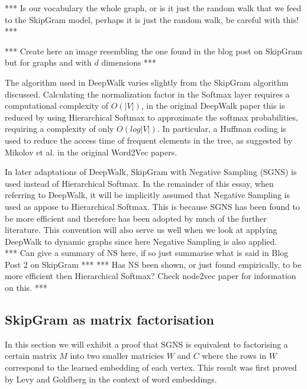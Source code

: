 \documentclass[a4paper]{article}
\begin{document}
*** Is our vocabulary the whole graph, or is it just the random walk that we
feed to the SkipGram model, perhaps it is just the random walk, be careful with
this! ***

*** Create here an image resembling the one found in the blog post on SkipGram
but for graphs and with $d$ dimensions ***

The algorithm used in DeepWalk varies slightly from the SkipGram algorithm
discussed. Calculating the normalization factor in the Softmax layer requires a
computational complexity of $O(|V|)$, in the original DeepWalk paper this is
reduced by using Hierarchical Softmax to approximate the softmax probabilities,
requiring a complexity of only $O(log|V|)$. In particular, a Huffman coding is
used to reduce the access time of frequent elements in the tree, as suggested by
Mikolov et al. in the original Word2Vec
papers.\cite{mikolov2013distributed,mikolov2013efficient}

In later adaptations of DeepWalk, SkipGram with Negative Sampling (SGNS) is used instead of
Hierarchical Softmax. In the remainder of this essay, when referring to DeepWalk, it will be
implicitly assumed that Negative Sampling is used as appose to Hierarchical
Softmax. This is because SGNS has been found to be more efficient
and therefore has been adopted by much of the further literature. This convention will also
serve us well when we look at applying DeepWalk to dynamic graphs since here
Negative Sampling is also applied.\\

*** Can give a summary of NS here, if so just summarise what is said in Blog
Post 2 on SkipGram ***
*** Has NS been shown, or just found empirically, to be more efficient then
Hierarchical Softmax? Check node2vec paper for information on this. ***

\subsection{SkipGram as matrix factorisation}
In this section we will exhibit a proof that SGNS is
equivalent to factorising a certain matrix $M$ into two smaller matricies $W$
and $C$ where the rows in $W$ correspond to the learned embedding of each vertex. This result was first proved by Levy and
Goldberg\cite{levy&goldberg} in the context of word embeddings.\\
\end{document}
